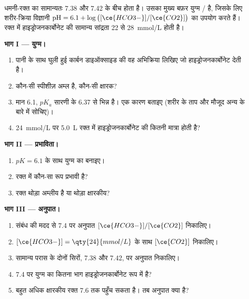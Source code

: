 \begin{problem}
\label{pb:g12:buffers-predominance:1}
धमनी-रक्त का  सामान्यतः 7.38 और 7.42 के बीच होता है। उसका मुख्य
बफ़र युग्म / है, जिसके लिए शरीर-क्रिया विज्ञानी
$\mathrm{pH} = 6.1 + \log\big([\ce{HCO3-}]/[\ce{CO2}]\big)$ का उपयोग करते हैं। रक्त में
हाइड्रोजनकार्बोनेट की सामान्य सांद्रता 22 से \qty{28}{mmol/L} होती है।

\medskip
\noindent\textbf{भाग I --- युग्म।}
\begin{enumerate}
  \item पानी के साथ घुली हुई कार्बन डाइऑक्साइड की वह अभिक्रिया लिखिए जो
        हाइड्रोजनकार्बोनेट  देती है।
  \item कौन-सी स्पीशीज़ अम्ल है, कौन-सी क्षारक?
  \item मान 6.1, $pK_a$ सारणी के 6.37 से भिन्न है। एक
        कारण बताइए (शरीर के ताप और मौजूद अन्य
         के बारे में सोचिए)।
  \item \qty{24}{mmol/L} पर \qty{5.0}{L} रक्त में हाइड्रोजनकार्बोनेट की कितनी मात्रा
        होती है?
\end{enumerate}

\medskip
\noindent\textbf{भाग II --- प्रभाविता।}
\begin{enumerate}[resume]
  \item $pK = 6.1$ के साथ युग्म का  बनाइए।
  \item रक्त में कौन-सा रूप प्रभावी है?
  \item रक्त थोड़ा अम्लीय है या थोड़ा क्षारकीय?
\end{enumerate}

\medskip
\noindent\textbf{भाग III --- अनुपात।}
\begin{enumerate}[resume]
  \item संबंध की मदद से  7.4 पर अनुपात $[\ce{HCO3-}]/[\ce{CO2}]$
        निकालिए।
  \item $[\ce{HCO3-}] = \qty{24}{mmol/L}$ के साथ $[\ce{CO2}]$ निकालिए।
  \item सामान्य परास के दोनों सिरों, 7.38 और
        7.42, पर अनुपात निकालिए।
  \item {} 7.4 पर युग्म का कितना भाग हाइड्रोजनकार्बोनेट रूप में
        है?
  \item बहुत अधिक क्षारकीय रक्त  7.6 तक पहुँच सकता है। तब अनुपात
        क्या है?
\end{enumerate}


\end{problem}
